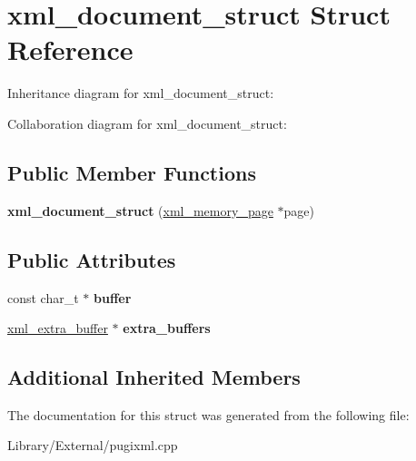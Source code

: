 \hypertarget{structxml__document__struct}{}\section{xml\+\_\+document\+\_\+struct Struct Reference}
\label{structxml__document__struct}


Inheritance diagram for xml\+\_\+document\+\_\+struct\+:


Collaboration diagram for xml\+\_\+document\+\_\+struct\+:
\subsection*{Public Member Functions}
\begin{DoxyCompactItemize}
\item 
\hypertarget{structxml__document__struct_aea3482436c20abd98ca063c3bd5dcfba}{}{\bfseries xml\+\_\+document\+\_\+struct} (\hyperlink{structxml__memory__page}{xml\+\_\+memory\+\_\+page} $\ast$page)\label{structxml__document__struct_aea3482436c20abd98ca063c3bd5dcfba}

\end{DoxyCompactItemize}
\subsection*{Public Attributes}
\begin{DoxyCompactItemize}
\item 
\hypertarget{structxml__document__struct_a120451f29b8cc2a82a3ecc926449ea0e}{}const char\+\_\+t $\ast$ {\bfseries buffer}\label{structxml__document__struct_a120451f29b8cc2a82a3ecc926449ea0e}

\item 
\hypertarget{structxml__document__struct_afe3b1efd5b683c306157244496f55c4b}{}\hyperlink{structxml__extra__buffer}{xml\+\_\+extra\+\_\+buffer} $\ast$ {\bfseries extra\+\_\+buffers}\label{structxml__document__struct_afe3b1efd5b683c306157244496f55c4b}

\end{DoxyCompactItemize}
\subsection*{Additional Inherited Members}


The documentation for this struct was generated from the following file\+:\begin{DoxyCompactItemize}
\item 
Library/\+External/pugixml.\+cpp\end{DoxyCompactItemize}
